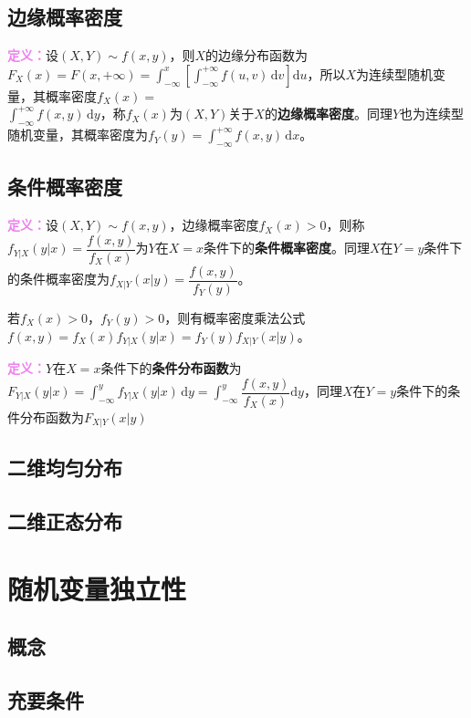 \documentclass[UTF8, 12pt]{ctexart}
\begin{document}
\subsection{边缘概率密度}

\textcolor{violet}{\textbf{定义：}}设$(X,Y)\sim f(x,y)$，则$X$的边缘分布函数为$F_X(x)=F(x,+\infty)=\int_{-\infty}^x\left[\int_{-\infty}^{+\infty}f(u,v)\,\textrm{d}v\right]\textrm{d}u$，所以$X$为连续型随机变量，其概率密度$f_X(x)=$\\$\int_{-\infty}^{+\infty}f(x,y)\,\textrm{d}y$，称$f_X(x)$为$(X,Y)$关于$X$的\textbf{边缘概率密度}。同理$Y$也为连续型随机变量，其概率密度为$f_Y(y)=\int_{-\infty}^{+\infty}f(x,y)\,\textrm{d}x$。

\subsection{条件概率密度}

\textcolor{violet}{\textbf{定义：}}设$(X,Y)\sim f(x,y)$，边缘概率密度$f_X(x)>0$，则称$f_{Y|X}(y|x)=\dfrac{f(x,y)}{f_X(x)}$为$Y$在$X=x$条件下的\textbf{条件概率密度}。同理$X$在$Y=y$条件下的条件概率密度为$f_{X|Y}(x|y)=\dfrac{f(x,y)}{f_Y(y)}$。

若$f_X(x)>0$，$f_Y(y)>0$，则有概率密度乘法公式$f(x,y)=f_X(x)f_{Y|X}(y|x)=f_Y(y)f_{X|Y}(x|y)$。

\textcolor{violet}{\textbf{定义：}}$Y$在$X=x$条件下的\textbf{条件分布函数}为$F_{Y|X}(y|x)=\int_{-\infty}^yf_{Y|X}(y|x)\,\textrm{d}y=\int_{-\infty}^y\dfrac{f(x,y)}{f_X(x)}\textrm{d}y$，同理$X$在$Y=y$条件下的条件分布函数为$F_{X|Y}(x|y)$

\subsection{二维均匀分布}

\subsection{二维正态分布}

\section{随机变量独立性}

\subsection{概念}

\subsection{充要条件}
\end{document}
